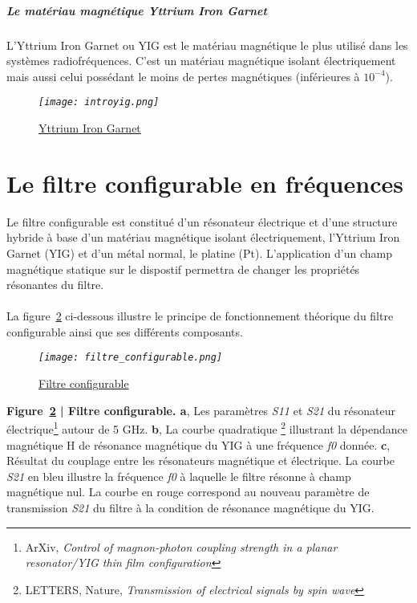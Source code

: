 \documentclass[12pt,fleqn]{book} %
\begin{document}
\subsubsection{Le matériau magnétique Yttrium Iron Garnet}
\noindent L'Yttrium Iron Garnet ou YIG est le matériau magnétique le plus utilisé dans les systèmes radiofréquences. C'est un matériau magnétique isolant électriquement mais aussi celui possédant le moins de pertes magnétiques (inférieures à $10^{-4}$).
\begin{figure}[H]
	\centering
	\itshape
	\texttt{[image: introyig.png]}
	\caption{\label{introspin} \underline{Yttrium Iron Garnet}}
\end{figure}
\part{Le filtre configurable en fréquences}
Le filtre configurable est constitué d’un résonateur électrique et d’une
structure hybride à base d’un matériau magnétique isolant électriquement, l’Yttrium
Iron Garnet (YIG) et d’un métal normal, le platine (Pt). L’application d’un champ
magnétique statique sur le dispostif permettra de changer les propriétés résonantes du
filtre.
~\\\\La figure~\underline{\color{blue}\ref{filtre}} ci-dessous illustre le principe de fonctionnement théorique du filtre configurable ainsi que ses différents composants.
\begin{figure}[H]
	\centering
	\itshape
	\texttt{[image: filtre\_configurable.png]}
	\caption{\label{filtre} \underline{Filtre configurable}}
\end{figure}
\noindent\footnotesize  \textbf{Figure~\underline{\color{blue}\ref{filtre}} | Filtre configurable. a}, Les paramètres \emph{S11} et \emph{S21} du résonateur électrique\footnote{ArXiv, \emph{Control of magnon-photon coupling strength in a planar resonator\slash YIG thin film configuration}} autour de 5 GHz. \textbf{b}, La courbe quadratique \footnote{LETTERS, Nature, \emph{Transmission of electrical signals by spin wave}} illustrant la dépendance magnétique H de résonance magnétique du YIG à une fréquence \emph{f0} donnée. \textbf{c}, Résultat du couplage entre les résonateurs magnétique et électrique\footnotemark[2]. La courbe \emph{S21} en bleu illustre la fréquence \emph{f0} à laquelle le filtre résonne à champ magnétique nul. La courbe en rouge correspond au nouveau paramètre de transmission \emph{S21} du filtre à la condition de résonance magnétique du YIG. 
\end{document}
